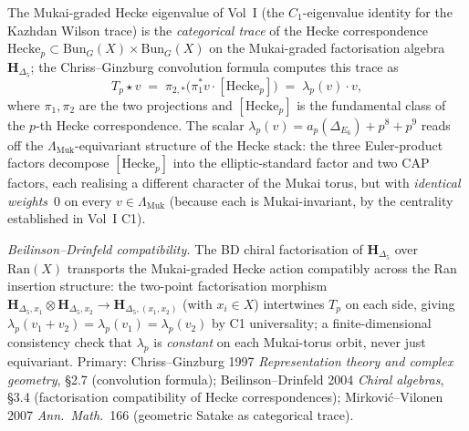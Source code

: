 \begin{remark}
\label{rem:gl-kazhdan-CG-convolution}
The Mukai-graded Hecke eigenvalue of Vol~I
(the $C_1$-eigenvalue identity for the Kazhdan Wilson trace) is the \emph{categorical trace}
of the Hecke correspondence
$\mathrm{Hecke}_p\subset\mathrm{Bun}_G(X)\times\mathrm{Bun}_G(X)$
on the Mukai-graded factorisation algebra $\mathbf{H}_{\Delta_5}$; the
Chriss--Ginzburg convolution formula computes this trace as
\[
 T_p \star v
 \;=\;
 \pi_{2,*}\bigl(\pi_1^*v \cdot [\mathrm{Hecke}_p]\bigr)
 \;=\;
 \lambda_p(v)\cdot v,
\]
where $\pi_1, \pi_2$ are the two projections and $[\mathrm{Hecke}_p]$
is the fundamental class of the $p$-th Hecke correspondence. The scalar
$\lambda_p(v) = a_p(\Delta_{E_6}) + p^8 + p^9$ reads off the
$\Lambda_{\mathrm{Muk}}$-equivariant structure of the Hecke stack:
the three Euler-product factors decompose $[\mathrm{Hecke}_p]$ into the
elliptic-standard factor and two CAP factors, each realising a different
character of the Mukai torus, but with \emph{identical weights}~$0$ on
every $v \in \Lambda_{\mathrm{Muk}}$ (because each is Mukai-invariant,
by the centrality established in Vol~I C1).

\emph{Beilinson--Drinfeld compatibility.} The BD chiral factorisation
of $\mathbf{H}_{\Delta_5}$ over $\mathrm{Ran}(X)$ transports the
Mukai-graded Hecke action compatibly across the Ran insertion structure:
the two-point factorisation morphism
$\mathbf{H}_{\Delta_5,x_1}\otimes\mathbf{H}_{\Delta_5,x_2}\to
\mathbf{H}_{\Delta_5,(x_1,x_2)}$
(with $x_i\in X$) intertwines $T_p$ on each side, giving
$\lambda_p(v_1+v_2) = \lambda_p(v_1) = \lambda_p(v_2)$ by C1
universality; a finite-dimensional consistency check that
$\lambda_p$ is \emph{constant} on each Mukai-torus orbit, never just
equivariant. Primary: Chriss--Ginzburg 1997 \emph{Representation theory
and complex geometry}, \S 2.7 (convolution formula);
Beilinson--Drinfeld 2004 \emph{Chiral algebras}, \S 3.4
(factorisation compatibility of Hecke correspondences);
Mirkovi\'c--Vilonen 2007 \emph{Ann.~Math.}~166 (geometric Satake
as categorical trace).
\end{remark}

